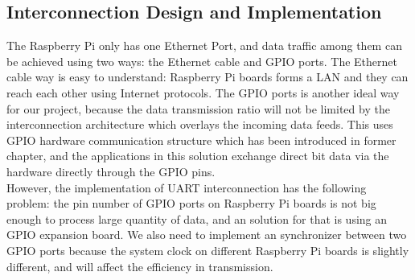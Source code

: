 \documentclass[11pt,openright,a4paper]{report}
\begin{document}
\subsection{Interconnection Design and Implementation}
The Raspberry Pi only has one Ethernet Port, and data traffic among them can be achieved using two ways: the Ethernet cable and GPIO ports. The Ethernet cable way is easy to understand: Raspberry Pi boards forms a LAN and they can reach each other using Internet protocols. The GPIO ports is another ideal way for our project, because the data transmission ratio will not be limited by the interconnection architecture which overlays the incoming data feeds. This uses GPIO hardware communication structure which has been introduced in former chapter, and the applications in this solution exchange direct bit data via the hardware directly through the GPIO pins.\\
However, the implementation of UART interconnection has the following problem: the pin number of GPIO ports on Raspberry Pi boards is not big enough to process large quantity of data, and an solution for that is using an GPIO expansion board. We also need to implement an synchronizer between two GPIO ports because the system clock on different Raspberry Pi boards is slightly different, and will affect the efficiency in transmission.\\
\end{document}

